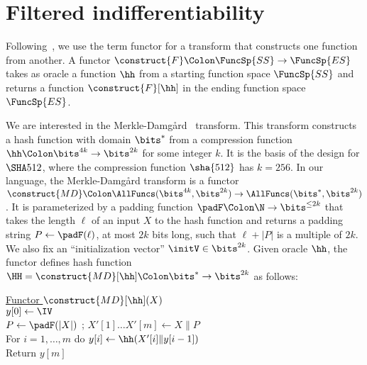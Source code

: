 \section{Filtered indifferentiability}\label{sec-fi} 

 Following~\cite{EC:BelDavGun20}, we use the term functor for a transform that constructs one function from another. A functor $\construct{F}\Colon\FuncSp{SS}\to\FuncSp{ES}$ takes as oracle a function $\hh$ from a starting function space $\FuncSp{SS}$ and returns a function $\construct{F}[\hh]$ in the ending function space $\FuncSp{ES}$.


 We are interested in the Merkle-Damg{\aa}rd~\cite{C:Merkle89a,C:Damgaard89b} transform. This transform constructs a hash function with domain $\bits^*$ from a compression function $\hh\Colon\bits^{4k}\to\bits^{2k}$ for some integer $k$. It is the basis of the design for $\SHA512$, where the compression function $\sha{512}$ has $k=256$. In our language, the Merkle-Damg{\aa}rd transform is a functor $\construct{MD}\Colon \allowbreak \AllFuncs(\bits^{4k},\allowbreak \bits^{2k}) \allowbreak  \to \allowbreak  \AllFuncs(\bits^{*}, \allowbreak  \bits^{2k})$. It  is parameterized by a padding function $\padF\Colon \N  \to\bits^{\leq 2k}$ that takes the length $\ell$ of an input $X$ to the hash function and returns a padding string $P \gets \padF(\ell)$, at most $2k$ bits long, such that $\ell+|P|$ is a multiple of $2k$.
We also fix an ``initialization vector'' $\initV \in \bits^{2k}$. Given oracle $\hh$, the functor defines hash function $\HH = \construct{MD}[\hh]\Colon\bits^{*}\to\bits^{2k}$ as follows:

\begin{tabbing}
\underline{Functor $\construct{MD}[\hh](X)$} \\[2pt]
$y[0] \gets \IV$ \\
$P\gets \padF(|X|)$ ; $X'[1]\ldots X'[m] \gets X\|P$  \\
For $i=1,\ldots,m$ do $y[i] \gets \hh(X'[i]\|y[i-1])$ \\
Return $y[m]$
\end{tabbing}



